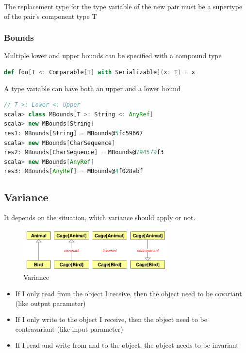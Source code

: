 The replacement type for the type variable of the new pair must be a
supertype of the pair's component type T

\hypertarget{bounds}{%
\subsubsection{Bounds}\label{bounds}}

Multiple lower and upper bounds can be specified with a compound type

\begin{lstlisting}[language=scala,mathescape=false]
def foo[T <: Comparable[T] with Serializable](x: T) = x
\end{lstlisting}

A type variable can have both an upper and a lower bound

\begin{lstlisting}[language=scala,mathescape=false]
// T >: Lower <: Upper
scala> class MBounds[T >: String <: AnyRef]
scala> new MBounds[String]
res1: MBounds[String] = MBounds@5fc59667
scala> new MBounds[CharSequence]
res2: MBounds[CharSequence] = MBounds@794579f3
scala> new MBounds[AnyRef]
res3: MBounds[AnyRef] = MBounds@4f028abf
\end{lstlisting}

\hypertarget{variance}{%
\subsection{Variance}\label{variance}}

It depends on the situation, which variance should apply or not.

\begin{figure}[H]
\centering
\includegraphics[width=0.7\textwidth]{figures/coAndContravarianz.png}
\caption{Variance}
\end{figure}

\begin{itemize}
\tightlist
\item
  If I only read from the object I receive, then the object need to be
  covariant (like output parameter)
\item
  If I only write to the object I receive, then the object need to be
  contravariant (like input parameter)
\item
  If I read and write from and to the object, the object needs to be
  invariant
\end{itemize}

